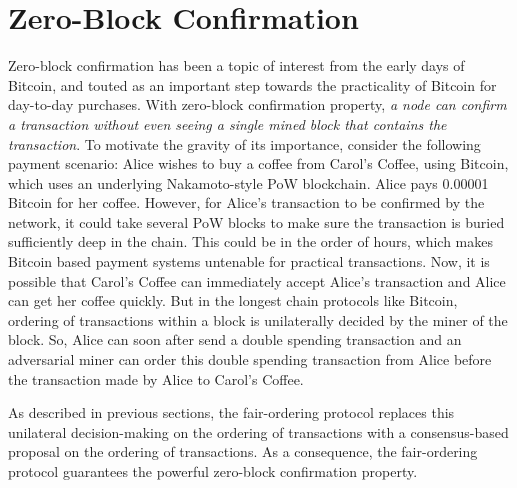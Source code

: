 \documentclass{article}
\begin{document}
\section*{Zero-Block Confirmation}
Zero-block confirmation has been a topic of interest from the early days of Bitcoin, and touted as an important step towards the practicality of Bitcoin for day-to-day purchases. With zero-block confirmation property, {\em a node can confirm a transaction without even seeing a single mined block that contains the transaction}. To motivate the gravity of its importance, consider the following payment scenario: Alice wishes to buy a coffee from Carol's Coffee, using Bitcoin, which uses an underlying Nakamoto-style PoW blockchain. Alice pays 0.00001 Bitcoin for her coffee. However, for Alice's transaction to be confirmed by the network, it could take several PoW blocks to make sure the transaction is buried sufficiently deep in the chain. This could be in the order of hours, which makes Bitcoin based payment systems untenable for practical transactions. Now, it is possible that Carol's Coffee can immediately accept Alice's transaction and Alice can get her coffee quickly. But in the longest chain protocols like Bitcoin, ordering of transactions within a block is unilaterally decided by the miner of the block. So, Alice can soon after send a double spending transaction and an adversarial miner can order this double spending transaction from Alice before the transaction made by Alice to Carol's Coffee.



As described in previous sections, the fair-ordering protocol replaces this unilateral decision-making on the ordering of transactions with a consensus-based proposal on the ordering of transactions. As a consequence, the fair-ordering protocol guarantees the powerful zero-block confirmation property. 
\end{document}
